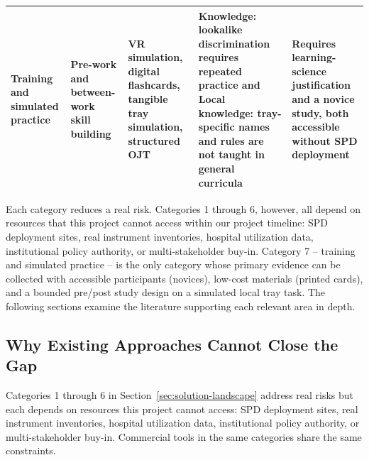 \documentclass[10pt,a4paper]{article}
\begin{document}
\begin{table}[H]
\begin{tabularx}{\textwidth}{|>{\raggedright\arraybackslash}p{2.2cm}|>{\raggedright\arraybackslash}p{1.8cm}|>{\raggedright\arraybackslash}X|>{\raggedright\arraybackslash}p{3cm}|>{\raggedright\arraybackslash}X|}
\hline
Training and simulated practice & Pre-work and between-work skill building & VR simulation, digital flashcards, tangible tray simulation, structured OJT & Knowledge: lookalike discrimination requires repeated practice and Local knowledge: tray-specific names and rules are not taught in general curricula & Requires learning-science justification and a novice study, both accessible without SPD deployment \\
\hline
\end{tabularx}
\end{table}
Each category reduces a real risk. Categories 1 through 6, however, all depend
on resources that this project cannot access within our project timeline: SPD
deployment sites, real instrument inventories, hospital utilization data,
institutional policy authority, or multi-stakeholder buy-in. Category 7 --
training and simulated practice -- is the only category whose primary evidence
can be collected with accessible participants (novices), low-cost materials
(printed cards), and a bounded pre/post study design on a simulated local tray
task. The following sections examine the literature supporting each relevant area in depth.
\subsection{Why Existing Approaches Cannot Close the Gap}


Categories 1 through 6 in Section~\ref{sec:solution-landscape} address real risks but each depends on resources this project cannot access: SPD deployment sites, real instrument inventories, hospital utilization data, institutional policy authority, or multi-stakeholder buy-in. Commercial tools in the same categories share the same constraints.
\end{document}
